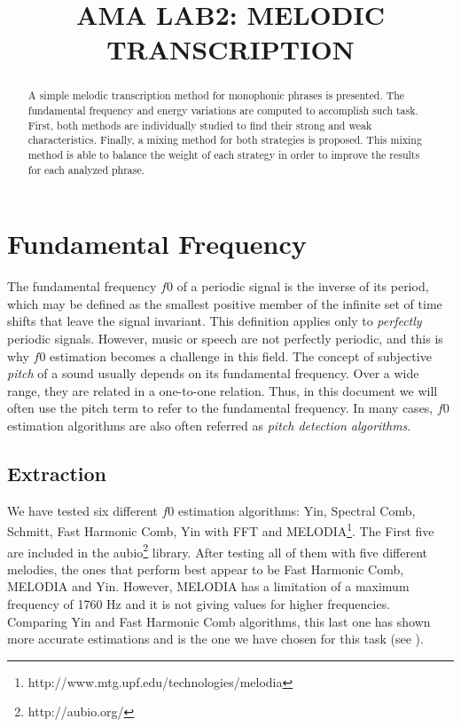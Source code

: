 \documentclass{article}
\title{AMA LAB2: MELODIC TRANSCRIPTION}
\begin{document}
%
\maketitle
%
\begin{abstract}
A simple melodic transcription method for monophonic phrases is presented.
The fundamental frequency and energy variations are computed to accomplish such task.
First, both methods are individually studied to find their strong and weak characteristics.
Finally, a mixing method for both strategies is proposed. This mixing method is able
to balance the weight of each strategy in order to improve the results for each
analyzed phrase.
\end{abstract}
%
\section{Fundamental Frequency}\label{sec:f0}

The fundamental frequency ${f0}$ of a periodic signal is the inverse of its period, which may be defined as the smallest positive member of the infinite set of time shifts that leave the signal invariant. This definition applies only to \textit{perfectly} periodic signals. However, music or speech are not perfectly periodic, and this is why ${f0}$ estimation becomes a challenge in this field. The concept of subjective \textit{pitch} of a sound usually depends on its fundamental frequency. Over a wide range, they are related in a one-to-one relation. Thus, in this document we will often use the pitch term to refer to the fundamental frequency. In many cases, ${f0}$ estimation algorithms are also often referred as \textit{pitch detection algorithms}.

\subsection{Extraction}\label{subsec:f0_extraction}

We have tested six different ${f0}$ estimation algorithms: Yin, Spectral Comb, Schmitt, Fast Harmonic Comb, Yin with FFT and MELODIA\footnote{http://www.mtg.upf.edu/technologies/melodia}. The First five are included in the aubio\footnote{http://aubio.org/} library. 
After testing all of them with five different melodies, the ones that perform best appear to be Fast Harmonic Comb, MELODIA and Yin. However, MELODIA has a limitation of a maximum frequency of 1760 Hz and it is not giving values for higher frequencies. Comparing Yin and Fast Harmonic Comb algorithms, this last one has shown more accurate estimations and is the one we have chosen for this task (see ).
\end{document}
